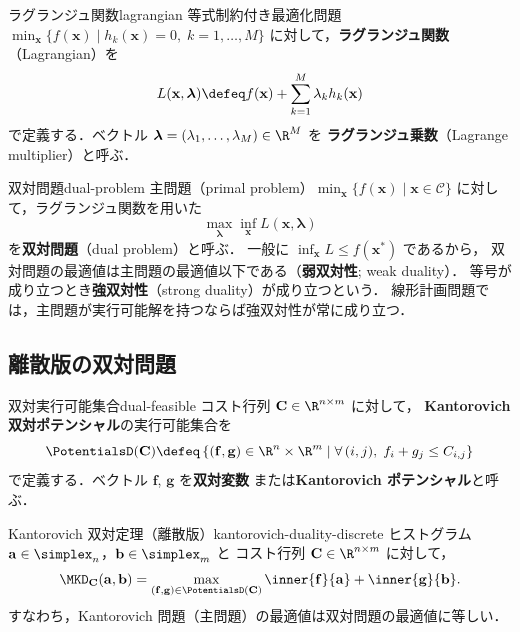 \begin{definition}{ラグランジュ関数}{lagrangian}
  等式制約付き最適化問題 $\min_{\mathbf{x}} \{f(\mathbf{x}) \mid h_k(\mathbf{x}) = 0,\; k = 1, \ldots, M\}$
  に対して，\textbf{ラグランジュ関数}（Lagrangian）を
  \[
    L(\mathbf{x}, \boldsymbol{\lambda})
    \defeq f(\mathbf{x}) + \sum_{k=1}^M \lambda_k h_k(\mathbf{x})
  \]
  で定義する．ベクトル $\boldsymbol{\lambda} = (\lambda_1, \ldots, \lambda_M) \in \R^M$ を
  \textbf{ラグランジュ乗数}（Lagrange multiplier）と呼ぶ．
\end{definition}

\begin{definition}{双対問題}{dual-problem}
  主問題（primal problem）$\min_{\mathbf{x}} \{f(\mathbf{x}) \mid \mathbf{x} \in \mathcal{C}\}$
  に対して，ラグランジュ関数を用いた
  \[
    \max_{\boldsymbol{\lambda}} \inf_{\mathbf{x}} L(\mathbf{x}, \boldsymbol{\lambda})
  \]
  を\textbf{双対問題}（dual problem）と呼ぶ．
  一般に $\inf_{\mathbf{x}} L \leq f(\mathbf{x}^*)$ であるから，
  双対問題の最適値は主問題の最適値以下である（\textbf{弱双対性}; weak duality）．
  等号が成り立つとき\textbf{強双対性}（strong duality）が成り立つという．
  線形計画問題では，主問題が実行可能解を持つならば強双対性が常に成り立つ．
\end{definition}

\subsection{離散版の双対問題}
\label{subsec:discrete-dual}

\begin{definition}{双対実行可能集合}{dual-feasible}
  コスト行列 $\mathbf{C} \in \R^{n \times m}$ に対して，
  \textbf{Kantorovich 双対ポテンシャル}の実行可能集合を
  \[
    \PotentialsD(\mathbf{C}) \defeq
    \left\{ (\mathbf{f}, \mathbf{g}) \in \R^n \times \R^m \;\middle|\;
    \forall\, (i, j), \; f_i + g_j \leq C_{i,j} \right\}
  \]
  で定義する．ベクトル $\mathbf{f}$, $\mathbf{g}$ を\textbf{双対変数}
  または\textbf{Kantorovich ポテンシャル}と呼ぶ．
\end{definition}

\begin{theorem}{Kantorovich 双対定理（離散版）}{kantorovich-duality-discrete}
  ヒストグラム $\mathbf{a} \in \simplex_n$，$\mathbf{b} \in \simplex_m$ と
  コスト行列 $\mathbf{C} \in \R^{n \times m}$ に対して，
  \[
    \MKD_{\mathbf{C}}(\mathbf{a}, \mathbf{b})
    = \max_{(\mathbf{f}, \mathbf{g}) \in \PotentialsD(\mathbf{C})}
    \inner{\mathbf{f}}{\mathbf{a}} + \inner{\mathbf{g}}{\mathbf{b}}.
  \]
  すなわち，Kantorovich 問題（主問題）の最適値は双対問題の最適値に等しい．
\end{theorem}

